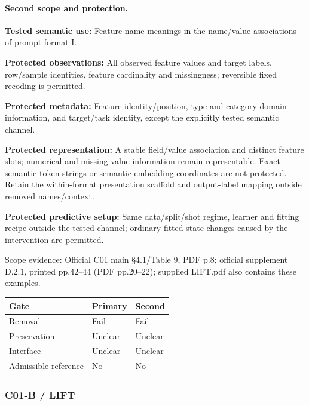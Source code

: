 \documentclass[10pt]{article}
\begin{document}
\paragraph{Second scope and protection.}
\textbf{Tested semantic use:} Feature-name meanings in the name/value associations of prompt format I.\par
\textbf{Protected observations:} All observed feature values and target labels, row/sample identities, feature cardinality and missingness; reversible fixed recoding is permitted.\par
\textbf{Protected metadata:} Feature identity/position, type and category-domain information, and target/task identity, except the explicitly tested semantic channel.\par
\textbf{Protected representation:} A stable field/value association and distinct feature slots; numerical and missing-value information remain representable. Exact semantic token strings or semantic embedding coordinates are not protected. Retain the within-format presentation scaffold and output-label mapping outside removed names/context.\par
\textbf{Protected predictive setup:} Same data/split/shot regime, learner and fitting recipe outside the tested channel; ordinary fitted-state changes caused by the intervention are permitted.\par
Scope evidence: Official C01 main §4.1/Table 9, PDF p.8; official supplement D.2.1, printed pp.42--44 (PDF pp.20--22); supplied LIFT.pdf also contains these examples.\par
\begin{tabular}{lll}\toprule Gate & Primary & Second \\ \midrule
Removal & Fail & Fail \\
Preservation & Unclear & Unclear \\
Interface & Unclear & Unclear \\
Admissible reference & No & No \\
\bottomrule\end{tabular}
\subsubsection*{C01-B / LIFT}
\end{document}
